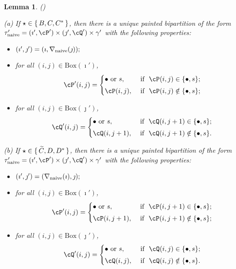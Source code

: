 \documentclass[11pt,a4paper]{amsart}
\def\DD{\nabla}
\numberwithin{equation}{section}
\newtheorem{lem}[thm]{Lemma}
\theoremstyle{remark}
\def\BOX{\mathrm{Box}}
\begin{document}
\begin{lem}(\cite[Lemmas 10.4 and 10.5]{BMSZa})
\label{lemDDn1} \label{lem:DDn}

\noindent (a) If $\star \in \set{B,C,C^*}$, then there is a unique painted bipartition of the form $\tau'_\mathrm{naive}= (\imath',\cP')\times (\jmath',\cQ')\times \gamma '$ with the following properties:
  \begin{itemize}
        \item $
   (\imath',\jmath')= (\imath,\DD_\mathrm{naive}(\jmath)); \smallskip
   $
   \item for all $(i,j)\in \BOX(\imath')$,
   \[
     \cP'(i,j)=\begin{cases}
    \bullet \textrm{ or } s,&\textrm{ if  $\ \cP(i,j)\in \{\bullet, s\}$;} \smallskip \\
  \cP(i,j),& \textrm{ if $\ \cP(i,j)\notin \{\bullet, s\}$};\end{cases}
   \]
   \item for all $(i,j)\in \BOX(\jmath')$,
   \[
     \cQ'(i,j)=\begin{cases}
    \bullet \textrm{ or } s,&\textrm{ if  $\ \cQ(i,j+1)\in \{\bullet, s\}$;} \smallskip \\
  \cQ(i,j+1), & \textrm{ if $\ \cQ(i,j+1)\notin \{\bullet, s\}$}.  \end{cases}
   \]
    \end{itemize}

\noindent (b) If $\star \in \set{ \widetilde C, D,D^*}$, 
 then there is a unique painted bipartition of the form 
 $\tau'_\mathrm{naive}= (\imath',\cP')\times (\jmath',\cQ')\times \gamma'$ with the following properties:
 \begin{itemize}
 \item $
 (\imath',\jmath')= (\DD_\mathrm{naive}(\imath),\jmath); \smallskip
 $
 \item for all $(i,j)\in \BOX(\imath')$,
 \[
 \cP'(i,j)=\begin{cases}
 \bullet \textrm{ or } s,&\textrm{ if  $\ \cP(i,j+1)\in \{\bullet, s\}$;} \smallskip \\
 \cP(i,j+1),& \textrm{ if $\ \cP(i,j+1)\notin \{\bullet, s\}$};\end{cases}
 \]
 \item for all $(i,j)\in \BOX(\jmath')$,
 \[
 \cQ'(i,j)=\begin{cases}
 \bullet \textrm{ or } s,&\textrm{ if  $\ \cQ(i,j)\in \{\bullet, s\}$;} \smallskip \\
 \cQ(i,j), & \textrm{ if $\ \cQ(i,j)\notin \{\bullet, s\}$}.  \end{cases}
 \]
 \end{itemize}
 \end{lem}
 
\end{document}
